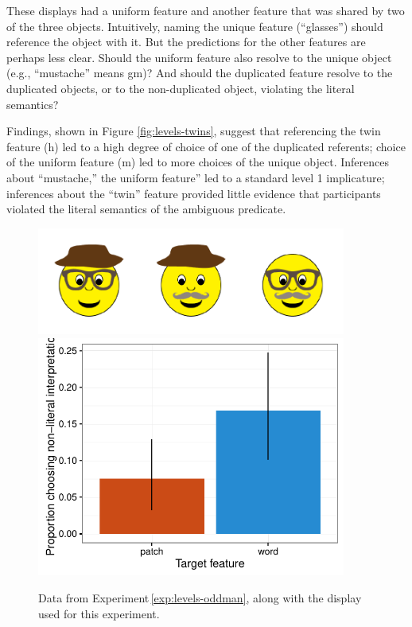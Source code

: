 \documentclass[man,noapacite]{apa2}
\newcounter{Experiment}
\newcommand{\exptref}[1]{Experiment\,\ref{#1}}
\begin{document}
\noindent These displays had a uniform feature and another feature that was shared by two of the three objects. Intuitively, naming the unique feature (``glasses'') should reference the object with it. But the predictions for the other features are perhaps less clear. Should the uniform feature also resolve to the unique object (e.g., ``mustache'' means {\sc gm})? And should the duplicated feature resolve to the duplicated objects, or to the non-duplicated object, violating the literal semantics?

Findings, shown in Figure \ref{fig:levels-twins}, suggest that referencing the twin feature ({\sc h}) led to a high degree of choice of one of the duplicated referents; choice of the uniform feature ({\sc m}) led to more choices of the unique object. Inferences about ``mustache,'' the uniform feature'' led to a standard level 1 implicature; inferences about the ``twin'' feature provided little evidence that participants violated the literal semantics of the ambiguous predicate.

 \begin{figure}[t]
  \centering
  \includegraphics[width=4in]{figures/levels-oddman-stim.pdf}
  \includegraphics[width=4in]{../plots/3-levels-oddman.pdf}

  \caption{\label{fig:levels-oddman} Data from \exptref{exp:levels-oddman}, along with the display used for this experiment.}
\end{figure}
\end{document}
